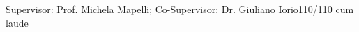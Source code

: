 \begin{experiences}
{    Supervisor: Prof. Michela Mapelli; Co-Supervisor: Dr. Giuliano Iorio}{110/110 cum laude}
   {}%
  \emptySeparator
\end{experiences}
